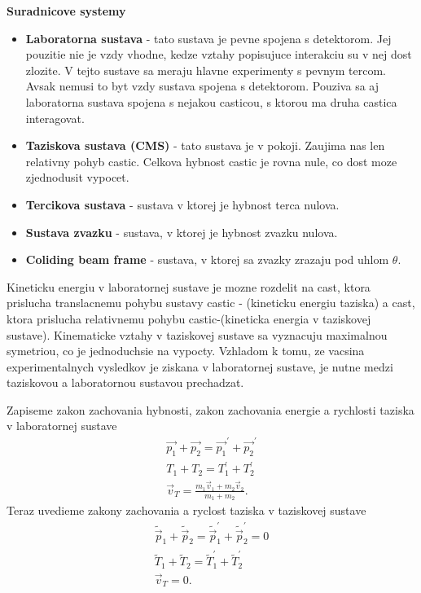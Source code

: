 \documentclass[../../main.tex]{subfiles}
\begin{document}
\textbf{Suradnicove systemy}\par
\begin{itemize}
	\item \textbf{Laboratorna sustava} - tato sustava je pevne spojena s detektorom. Jej pouzitie nie je vzdy vhodne, kedze vztahy popisujuce interakciu su v nej dost zlozite. V tejto sustave sa meraju hlavne experimenty s pevnym tercom. Avsak nemusi to byt vzdy sustava spojena s detektorom. Pouziva sa aj laboratorna sustava spojena s nejakou casticou, s ktorou ma druha castica interagovat.
	\item \textbf{Taziskova sustava (CMS)} - tato sustava je v pokoji. Zaujima nas len relativny pohyb castic. Celkova hybnost castic je rovna nule, co dost moze zjednodusit vypocet.
	\item \textbf{Tercikova sustava} - sustava v ktorej je hybnost terca nulova.
	\item \textbf{Sustava zvazku} - sustava, v ktorej je hybnost zvazku nulova.
	\item \textbf{Coliding beam frame} - sustava, v ktorej sa zvazky zrazaju pod uhlom $\theta$.
\end{itemize}
Kineticku energiu v laboratornej sustave je mozne rozdelit na cast, ktora prislucha translacnemu pohybu sustavy castic - (kineticku energiu taziska) a cast, ktora prislucha relativnemu pohybu castic-(kineticka energia v taziskovej sustave). Kinematicke vztahy v taziskovej sustave sa vyznacuju maximalnou symetriou, co je jednoduchsie na vypocty. Vzhladom k tomu, ze vacsina experimentalnych vysledkov je ziskana v laboratornej sustave, je nutne medzi taziskovou a laboratornou sustavou prechadzat.\par
Zapiseme zakon zachovania hybnosti, zakon zachovania energie a rychlosti taziska v laboratornej sustave
\begin{equation}
\begin{gathered}
\vec{p_1}+\vec{p_2}=\vec{p_1}^{\prime}+\vec{p_2}^{\prime} \\
T_1+T_2=T_1^{\prime}+T_2^{\prime} \\
\vec{v}_T=\frac{m_1\vec{v}_1+m_2\vec{v}_2}{m_1+m_2}.
\end{gathered}
\end{equation}
Teraz uvedieme zakony zachovania a ryclost taziska v taziskovej sustave
\begin{equation}
\begin{gathered}
\tilde{\vec{p}}_1+\tilde{\vec{p}}_2=\tilde{\vec{p}}_1^{\prime}+\tilde{\vec{p}}_2^{\prime}=0 \\
\tilde{T}_1+\tilde{T}_2=\tilde{T}_1^{\prime}+\tilde{T}_2^{\prime} \\
\vec{v}_T=0.
\end{gathered}
\end{equation}
\end{document}
